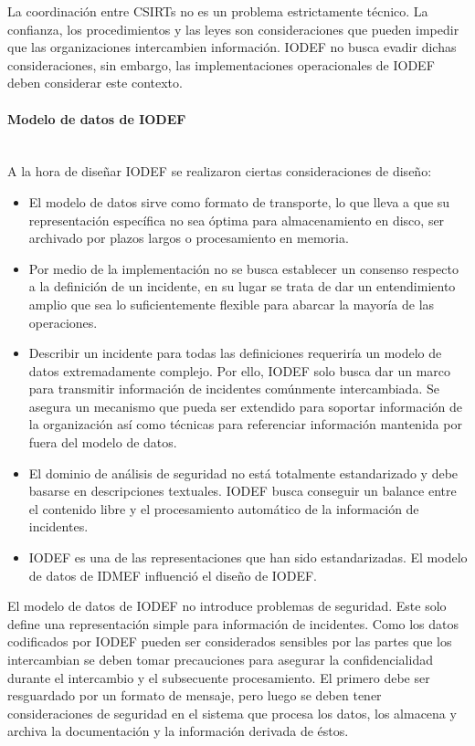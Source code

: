 La coordinación entre CSIRTs no es un problema estrictamente técnico. La 
confianza, los procedimientos y las leyes son consideraciones que pueden impedir 
que las organizaciones intercambien información. IODEF no busca evadir dichas 
consideraciones, sin embargo, las implementaciones operacionales de IODEF deben 
considerar este contexto.

\paragraph{Modelo de datos de IODEF}\ \\

A la hora de diseñar IODEF se realizaron ciertas consideraciones de diseño:
\begin{itemize}
  \item El modelo de datos sirve como formato de transporte, lo que lleva a que 
  su representación específica no sea óptima para almacenamiento en disco, 
  ser archivado por plazos largos o procesamiento en memoria.
  \item Por medio de la implementación no se busca establecer un consenso 
  respecto a la definición de un incidente, en su lugar se trata de dar un 
  entendimiento amplio que sea lo suficientemente flexible para abarcar la 
  mayoría de las operaciones.
  \item Describir un incidente para todas las definiciones requeriría un modelo 
  de datos extremadamente complejo. Por ello, IODEF solo busca dar un marco para 
  transmitir información de incidentes comúnmente intercambiada. Se asegura un 
  mecanismo que pueda ser extendido para soportar información de la 
  organización así como técnicas para referenciar información mantenida por 
  fuera del modelo de datos.
  \item El dominio de análisis de seguridad no está totalmente estandarizado y 
  debe basarse en descripciones textuales. IODEF busca conseguir un balance 
  entre el contenido libre y el procesamiento automático de la información de 
  incidentes.
  \item IODEF es una de las representaciones que han sido estandarizadas.
   El modelo de datos de IDMEF influenció el diseño de IODEF.

\end{itemize}

El modelo de datos de IODEF no introduce problemas de seguridad. Este solo 
define una representación simple para información de incidentes. Como los datos 
codificados por IODEF pueden ser considerados sensibles por las partes que los 
intercambian se deben tomar precauciones para asegurar la confidencialidad 
durante el intercambio y el subsecuente procesamiento. El primero debe ser 
resguardado por un formato de mensaje, pero luego se deben tener consideraciones 
de seguridad en el sistema que procesa los datos, los almacena y archiva la 
documentación y la información derivada de éstos.\\

